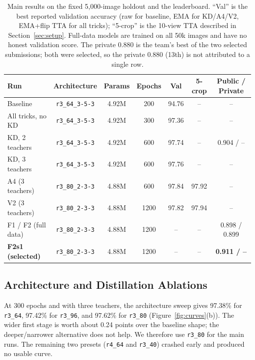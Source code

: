 \begin{table}[t]
\centering
\small
\setlength{\tabcolsep}{4pt}
\caption{Main results on the fixed 5,000-image holdout and the leaderboard.
``Val'' is the best reported validation accuracy (raw for baseline, EMA for
KD/A4/V2, EMA+flip TTA for all tricks); ``5-crop'' is the 10-view TTA described
in Section~\ref{sec:setup}. Full-data models are trained on all 50k images and
have no honest validation score. The private 0.880 is the team's best of the two
selected submissions; both were selected, so the private 0.880 (13th) is not
attributed to a single row.}
\label{tab:main}
\begin{tabular}{@{}lcccccc@{}}
\toprule
Run & Architecture & Params & Epochs & Val & 5-crop & Public / Private \\
\midrule
Baseline & \texttt{r3\_64\_3-5-3} & 4.92M & 200 & 94.76 & -- & -- \\
All tricks, no KD & \texttt{r3\_64\_3-5-3} & 4.92M & 300 & 97.36 & -- & -- \\
KD, 2 teachers & \texttt{r3\_64\_3-5-3} & 4.92M & 600 & 97.74 & -- & 0.904 / -- \\
KD, 3 teachers & \texttt{r3\_64\_3-5-3} & 4.92M & 600 & 97.76 & -- & -- \\
A4 (3 teachers) & \texttt{r3\_80\_2-3-3} & 4.88M & 600 & 97.84 & 97.92 & -- \\
V2 (3 teachers) & \texttt{r3\_80\_2-3-3} & 4.88M & 1200 & 97.82 & 97.94 & -- \\
F1 / F2 (full data) & \texttt{r3\_80\_2-3-3} & 4.88M & 1200 & -- & -- & 0.898 / 0.899 \\
\textbf{F2s1 (selected)} & \texttt{r3\_80\_2-3-3} & 4.88M & 1200 & -- & -- & \textbf{0.911 / --} \\
\bottomrule
\end{tabular}
\end{table}

\subsection{Architecture and Distillation Ablations}

At 300 epochs and with three teachers, the architecture sweep gives 97.38\% for
\texttt{r3\_64}, 97.42\% for \texttt{r3\_96}, and 97.62\% for \texttt{r3\_80}
(Figure~\ref{fig:curves}(b)). The wider first stage is worth about 0.24 points
over the baseline shape; the deeper/narrower alternative does not help. We
therefore use \texttt{r3\_80} for the main runs. The remaining two presets
(\texttt{r4\_64} and \texttt{r3\_40}) crashed early and produced no usable curve.

